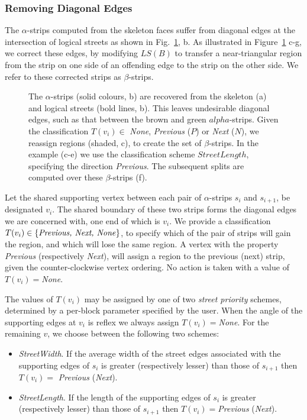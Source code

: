 \subsubsection{Removing Diagonal Edges}


The $\alpha$-strips computed from the skeleton faces suffer from diagonal edges at the intersection of logical streets as shown in Fig.~\ref{fig:take_corner}, b. As illustrated in Figure~\ref{fig:take_corner} c-g, we correct these edges, by modifying $LS(B)$ to transfer a near-triangular region from the strip on one side of an offending edge to the strip on the other side. We refer to these corrected strips as $\beta$-strips.


\begin{figure}
\centering
\def\svgwidth{0.8\columnwidth}

\caption[Strips sharing a block's corner]{\label{fig:take_corner}The $\alpha$-strips (solid colours, b) are recovered from the skeleton (a) and logical streets (bold lines, b). This leaves undesirable diagonal edges, such as that between the brown and green $alpha$-strips. Given the classification $T(v_i) \in$  \emph{None}, \emph{Previous} ($P$) or \emph{Next} ($N$), we reassign regions (shaded, c), to create the set of $\beta$-strips. In the example (c-e) we use the classification scheme $StreetLength$, specifying the direction \emph{Previous}. The subsequent splits are computed over these $\beta$-strips (f).}
\end{figure}

Let the shared supporting vertex between each pair of $\alpha$-strips $s_i$ and $s_{i+1}$, be designated $v_i$. The shared boundary of these two strips forms the diagonal edges we are concerned with, one end of which is $v_i$. We provide a classification $T(v_i) \in \left\{\text{\emph{Previous, Next, None}}\right\}$, to specify which of the pair of strips will gain the region, and which will lose the same region. A vertex with the property \emph{Previous} (respectively \emph{Next}), will assign a region to the previous (next) strip, given the counter-clockwise vertex ordering. No action is taken with a value of $T(v_i) = $\emph{None}.


The values of $T(v_i)$ may be assigned by one of two \emph{street priority} schemes, determined by a per-block parameter specified by the user. When the angle of the supporting edges at $v_i$ is reflex we always assign $T(v_i) = $\emph{None}. For the remaining $v$, we choose between the following two schemes:
\begin{itemize}
\item \emph{StreetWidth}. If the average width of the street edges associated with the supporting edges of $s_i$ is greater (respectively lesser) than those of $s_{i+1}$ then $T(v_i) = $ \emph{Previous} (\emph{Next}).
\item \emph{StreetLength}. If the length of the supporting edges of $s_i$ is greater (respectively lesser) than those of $s_{i+1}$ then $T(v_i) = $\emph{Previous} (\emph{Next}).
\end{itemize}

